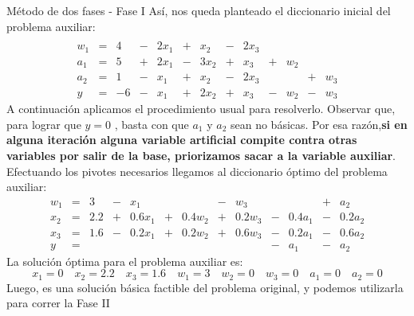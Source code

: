 \documentclass[10pt, aspectratio=169]{beamer}
\begin{document}
    \begin{frame}{Método de dos fases - Fase I}
        \footnotesize
        Así, nos queda planteado el diccionario inicial del problema auxiliar:
        \[
            \begin{array}{rrrrrrrrrrrrr}
                & \\
                w_1 & = & 4  & - & 2x_1 & + & x_2  & - & 2x_3 &   &     &   &     \\
                a_1 & = & 5  & + & 2x_1 & - & 3x_2 & + & x_3  & + & w_2 &   &     \\
                a_2 & = & 1  & - & x_1  & + & x_2  & - & 2x_3 &   &     & + & w_3 \\  \hline
                y   & = & -6 & - & x_1  & + & 2x_2 & + & x_3  & - & w_2 & - & w_3
            \end{array}
        \]
        A continuación aplicamos el procedimiento usual para resolverlo. Observar que, para lograr que $y=0$
        , basta con que $a_1$ y $a_2$ sean no básicas. Por esa razón,\textbf
        {si en alguna iteración alguna variable artificial compite contra otras variables por salir de la base,
            priorizamos sacar a la variable auxiliar}.
        \vskip 0.3cm
        Efectuando los pivotes necesarios llegamos al diccionario óptimo del problema auxiliar:
        \[
            \begin{array}{rrrrrrrrrrrrr}
                w_1 & = & 3   & - & x_1    &   &        & - & w_3    &   &        & + & a_2    \\
                x_2 & = & 2.2 & + & 0.6x_1 & + & 0.4w_2 & + & 0.2w_3 & - & 0.4a_1 & - & 0.2a_2 \\
                x_3 & = & 1.6 & - & 0.2x_1 & + & 0.2w_2 & + & 0.6w_3 & - & 0.2a_1 & - & 0.6a_2 \\ \hline
                y   & = &     &   &        &   &        &   &        & - & a_1    & - & a_2
            \end{array}
        \]
        La solución óptima para el problema auxiliar es:
        \[ x_1=0 \quad x_2=2.2 \quad x_3=1.6 \quad w_1=3 \quad w_2=0 \quad w_3=0 \quad a_1=0 \quad a_2=0 \]
        Luego, es una solución básica factible del problema original, y podemos utilizarla para correr la Fase II
    \end{frame}
\end{document}
